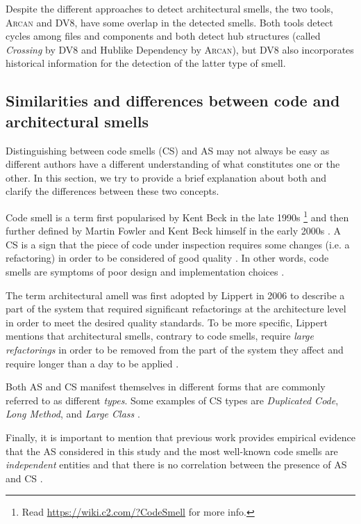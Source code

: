 Despite the different approaches to detect architectural smells, the two tools,  \textsc{Arcan} and DV8, have some overlap in the detected smells. 
Both tools detect cycles among files and components and both detect hub structures (called \emph{Crossing} by DV8 and Hublike Dependency by \textsc{Arcan}), but DV8 also incorporates historical information for the detection of the latter type of smell.


\subsection{Similarities and differences between code and architectural smells}
Distinguishing between code smells (CS) and AS may not always be easy as different authors have a different understanding of what constitutes one or the other.
In this section, we try to provide a brief explanation about both and clarify the differences between these two concepts.

Code smell is a term first popularised by Kent Beck in the late 1990s \footnote{Read \url{https://wiki.c2.com/?CodeSmell} for more info.} and then further defined by Martin Fowler and Kent Beck himself in the early 2000s \cite{Fowler2002}.
A CS is a sign that the piece of code under inspection requires some changes (i.e. a refactoring) in order to be considered of good quality \cite{Fowler2002}. 
In other words, code smells are symptoms of poor design and implementation choices \cite{Tufano2015}.

The term architectural amell was first adopted by Lippert \cite{Lippert2006} in 2006 to describe a part of the system that required significant refactorings at the architecture level in order to meet the desired quality standards.
To be more specific, Lippert mentions that architectural smells, contrary to code smells, require \emph{large refactorings} in order to be removed from the part of the system they affect and require longer than a day to be applied \cite{Lippert2006}.

Both AS and CS manifest themselves in different forms that are commonly referred to as different \emph{types}.
Some examples of CS types are \emph{Duplicated Code}, \emph{Long Method}, and \emph{Large Class} \cite{Fowler2002}.

Finally, it is important to mention that previous work provides empirical evidence that the AS  considered in this study and the most well-known code smells are \emph{independent} entities and that there is no correlation between the presence of AS and CS \cite{Arcelli2019}.

